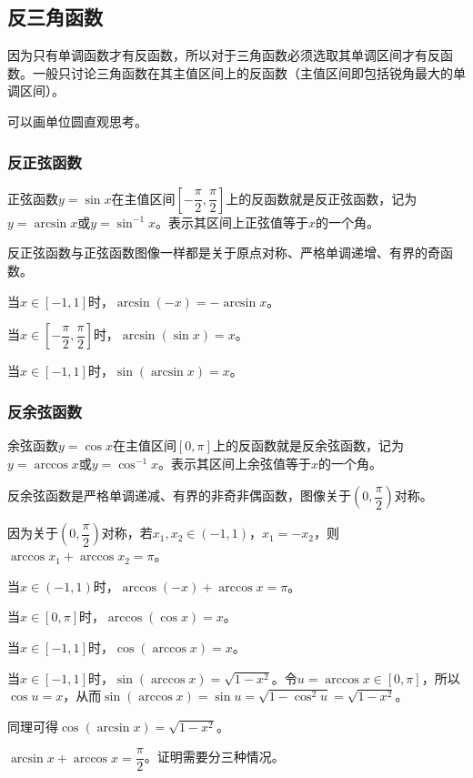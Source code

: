 \documentclass[UTF8, 12pt]{ctexart}
\begin{document}
\subsection{反三角函数}

因为只有单调函数才有反函数，所以对于三角函数必须选取其单调区间才有反函数。一般只讨论三角函数在其主值区间上的反函数（主值区间即包括锐角最大的单调区间）。

可以画单位圆直观思考。

\subsubsection{反正弦函数}

正弦函数$y=\sin x$在主值区间$\left[-\dfrac{\pi}{2},\dfrac{\pi}{2}\right]$上的反函数就是反正弦函数，记为$y=\arcsin x$或$y=\sin^{-1}x$。表示其区间上正弦值等于$x$的一个角。

反正弦函数与正弦函数图像一样都是关于原点对称、严格单调递增、有界的奇函数。

当$x\in[-1,1]$时，$\arcsin(-x)=-\arcsin x$。

当$x\in\left[-\dfrac{\pi}{2},\dfrac{\pi}{2}\right]$时，$\arcsin(\sin x)=x$。

当$x\in[-1,1]$时，$\sin(\arcsin x)=x$。

\subsubsection{反余弦函数}

余弦函数$y=\cos x$在主值区间$[0,\pi]$上的反函数就是反余弦函数，记为$y=\arccos x$或$y=\cos^{-1}x$。表示其区间上余弦值等于$x$的一个角。

反余弦函数是严格单调递减、有界的非奇非偶函数，图像关于$\left(0,\dfrac{\pi}{2}\right)$对称。

因为关于$\left(0,\dfrac{\pi}{2}\right)$对称，若$x_1,x_2\in(-1,1)$，$x_1=-x_2$，则$\arccos x_1+\arccos x_2=\pi$。

当$x\in(-1,1)$时，$\arccos(-x)+\arccos x=\pi$。

当$x\in[0,\pi]$时，$\arccos(\cos x)=x$。

当$x\in[-1,1]$时，$\cos(\arccos x)=x$。

当$x\in[-1,1]$时，$\sin(\arccos x)=\sqrt{1-x^2}$。令$u=\arccos x\in[0,\pi]$，所以$\cos u=x$，从而$\sin(\arccos x)=\sin u=\sqrt{1-\cos^2u}=\sqrt{1-x^2}$。

同理可得$\cos(\arcsin x)=\sqrt{1-x^2}$。

$\arcsin x+\arccos x=\dfrac{\pi}{2}$。证明需要分三种情况。
\end{document}
